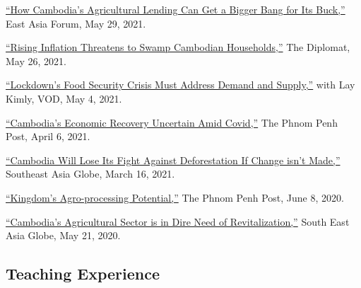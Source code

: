 \documentclass[10pt,a4paper]{article}
\begin{document}
	\href{https://www.eastasiaforum.org/2021/05/29/how-cambodias-agricultural-lending-can-get-a-bigger-bang-for-its-buck/}{``How Cambodia's Agricultural Lending Can Get a Bigger Bang for Its Buck,''} East Asia Forum, May 29, 2021.\\ \vspace{-.5em}

	\href{https://thediplomat.com/2021/05/rising-inflation-threatens-to-swamp-cambodian-households/}{``Rising Inflation Threatens to Swamp Cambodian Households,''} The Diplomat, May 26, 2021.\\ \vspace{-.5em}

	\href{https://vodenglish.news/opinion-lockdowns-food-security-crisis-must-address-demand-and-supply/}{``Lockdown's Food Security Crisis Must Address Demand and Supply,''} with Lay Kimly, VOD, May 4, 2021.\\ \vspace{-.5em}

	\href{https://www.phnompenhpost.com/opinion/cambodias-economic-recovery-uncertain-amid-covid}{``Cambodia's Economic Recovery Uncertain Amid Covid,''} The Phnom Penh Post, April 6, 2021.\\ \vspace{-.5em}

	\href{https://southeastasiaglobe.com/cambodia-deforestation-fight/}{``Cambodia Will Lose Its Fight Against Deforestation If Change isn't Made,''} Southeast Asia Globe, March 16, 2021.\\ \vspace{-.5em}

	\href{https://www.phnompenhpost.com/opinion/kingdoms-agro-processing-potential}{``Kingdom’s Agro-processing Potential,''} The Phnom Penh Post, June 8, 2020.\\  \vspace{-.5em}

	 \href{https://southeastasiaglobe.com/cambodias-agricultural-sector-is-one-in-dire-need-of-revitalising}{``Cambodia’s Agricultural Sector is in Dire Need of Revitalization,''} South East Asia Globe, May 21, 2020. 

\subsection*{Teaching Experience}
\end{document}
